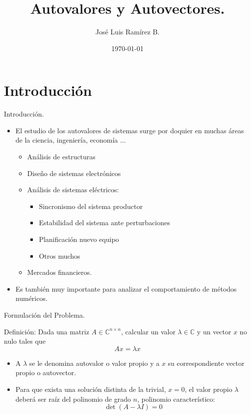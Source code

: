 \documentclass[11pt]{beamer}
\title{Autovalores y Autovectores.}
\author{Jos\'e Luis Ram\'irez B.}
\date{\today}
\begin{document}
\frame{\titlepage}
\frame{\tableofcontents}
\section{Introducci\'on}
\begin{frame}{Introducci\'on.}
  \begin{itemize}
    \item<1-> El estudio de los autovalores de sistemas surge por doquier en muchas \'areas de la 
   ciencia, ingenier\'ia, econom\'ia ...
   \begin{itemize}
      \item<2-> An\'alisis de estructuras
      \item<3-> Dise\~no de sistemas electr\'onicos
      \item<4-> An\'alisis de sistemas el\'ectricos:
      \begin{itemize}
         \item<5-> Sincronismo del sistema productor
         \item<6-> Estabilidad del sistema ante perturbaciones
         \item<7-> Planificaci\'on nuevo equipo
         \item<8-> Otros muchos
      \end{itemize}
      \item<9-> Mercados financieros.
   \end{itemize}
   \item<10-> Es tambi\'en muy importante para analizar el comportamiento de m\'etodos num\'ericos.
   \end{itemize}
\end{frame}
  \begin{frame}{Formulaci\'on del Problema.}
    \begin{block}{Definici\'on:}
       Dada una matriz $A \in \mathbb{C}^{n \times n}$, calcular un valor $\lambda \in \mathbb{C}$ y un 
    vector $x$ no nulo tales que
    $$
    Ax = \lambda x
    $$
    \end{block}
    \begin{itemize}
    \item<2-> A $\lambda$ se le denomina autovalor o valor propio y a $x$ su correspondiente vector 
    propio o autovector.
    \item<3-> Para que exista una soluci\'on distinta de la trivial, $x = 0$, el valor propio $\lambda$ 
    deber\'a ser ra\'iz del polinomio de grado $n$, polinomio caracter\'istico:
    $$
    \det(A - \lambda I) = 0
    $$
    \end{itemize}
    \end{frame}
\end{document}
